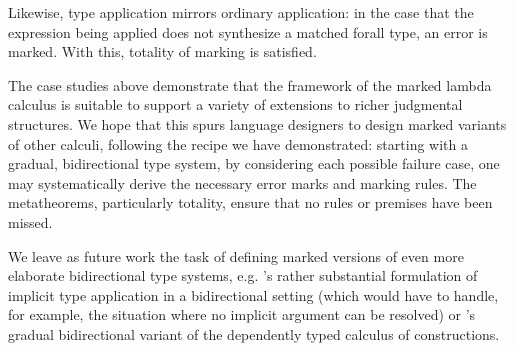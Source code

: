 Likewise, type application mirrors ordinary application: in the case that the expression being applied does not synthesize a matched forall type, an error is marked. With this, totality of marking is satisfied.
%
\begin{mathpar}

\end{mathpar}

The case studies above demonstrate that the framework of the marked lambda calculus is suitable to support a variety of extensions to richer judgmental structures.
We hope that this spurs language designers to design marked variants of other calculi, following the
recipe we have demonstrated: starting with a gradual, bidirectional type system, by considering each
possible failure case, one may systematically derive the necessary error marks and marking rules.
The metatheorems, particularly totality, ensure that no rules or premises have been missed.

We leave as future work the task of defining marked versions of even more elaborate bidirectional
type systems, e.g. \citet{dunfield2013complete}'s rather substantial formulation of implicit type
application in a bidirectional setting (which would have to handle, for example, the situation where
no implicit argument can be resolved) or \citet{DBLP:phd/hal/LennonBertrand22}'s gradual bidirectional
variant of the dependently typed calculus of constructions. 

